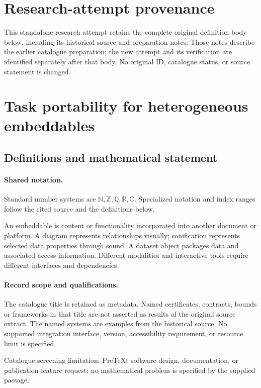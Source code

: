 \documentclass[11pt]{article}
\begin{document}
\section*{Research-attempt provenance}
This standalone research attempt retains the complete original definition body below,
including its historical source and preparation notes. Those notes describe the
earlier catalogue preparation; the new attempt and its verification are identified
separately after that body. No original ID, catalogue status, or source statement is changed.

\section{Task portability for heterogeneous embeddables}\label{statement}

\subsection{Definitions and mathematical statement}

\paragraph{Shared notation.}Standard number systems are $\mathbb N,\mathbb Z,\mathbb Q,\mathbb R,\mathbb C$. Specialized notation and index ranges follow the cited source and the definitions below.


An embeddable is content or functionality incorporated into another document or platform. A diagram represents relationships visually; sonification represents selected data properties through sound. A dataset object packages data and associated access information. Different modalities and interactive tools require different interfaces and dependencies.
\paragraph{Record scope and qualifications.}
The catalogue title is retained as metadata. Named certificates, contracts, bounds or frameworks in that title are not asserted as results of the original source extract.
The named systems are examples from the historical source. No supported integration interface, version, accessibility requirement, or resource limit is specified.

Catalogue screening limitation: PreTeXt software design, documentation, or publication feature request; no mathematical problem is specified by the supplied passage.
\end{document}
